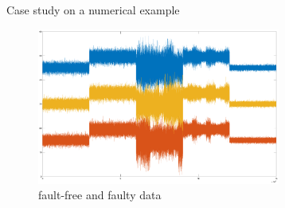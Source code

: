 \documentclass[10pt]{beamer}
\begin{document}
\begin{frame}{Case study on a numerical example}
      \begin{figure}
        \centering
        \includegraphics[width=8cm]{fig/Coriginal.eps}
        \caption{fault-free and faulty data}
    \end{figure}
\end{frame}
\end{document}
